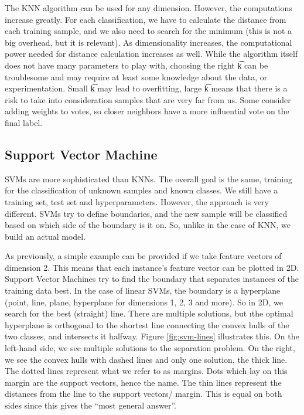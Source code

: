 The KNN algorithm can be used for any dimension. However, the computations increase greatly. For each classification, we have to calculate the distance from each training sample, and we also need to search for the minimum (this is not a big overhead, but it is relevant). As dimensionality increases, the computational power needed for distance calculation increases as well. While the algorithm itself does not have many parameters to play with, choosing the right \t{k} can be troublesome and may require at least some knowledge about the data, or experimentation. Small \t{k} may lead to overfitting, large \t{k} means that there is a risk to take into consideration samples that are very far from us. Some consider adding weights to votes, so closer neighbors have a more influential vote on the final label.



\subsection{Support Vector Machine}

SVMs are more sophisticated than KNNs. The overall goal is the same, training for the classification of unknown samples and known classes. We still have a training set, test set and hyperparameters. However, the approach is very different. SVMs try to define boundaries, and the new sample will be classified based on which side of the boundary is it on. So, unlike in the case of KNN, we build an actual model.

As previously, a simple example can be provided if we take feature vectors of dimension 2. This means that each instance's feature vector can be plotted in 2D. Support Vector Machines try to find the boundary that separates instances of the training data best. In the case of linear SVMs, the boundary is a hyperplane (point, line, plane, hyperplane for dimensions 1, 2, 3 and more). So in 2D, we search for the best (straight) line. There are multiple solutions, but \i{the optimal hyperplane is orthogonal to the shortest line connecting the convex hulls of the two classes, and intersects it halfway}\cite{svm}. Figure \ref{fig:svm-lines} illustrates this. On the left-hand side, we see multiple solutions to the separation problem. On the right, we see the convex hulls with dashed lines and only one solution, the thick line. The dotted lines represent what we refer to as margins. Dots which lay on this margin are the support vectors, hence the name. The thin lines represent the distances from the line to the support vectors/ margin. This is equal on both sides since this gives the ``most general answer''. 

